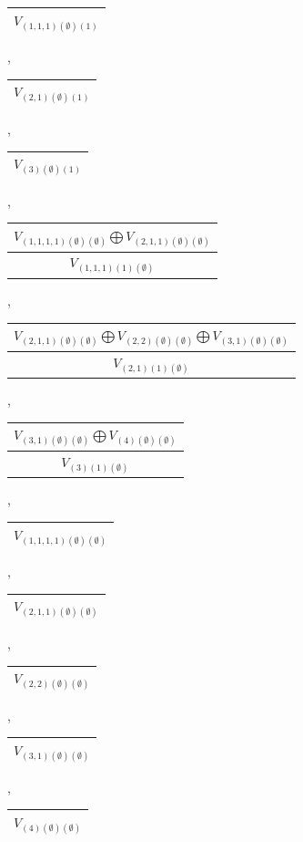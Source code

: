 \documentclass[letterpaper,11pt]{article}
\begin{document}
	\begin{tabular}{| c |}
		\hline
		$V_{(1,1,1)(\emptyset)(1)}$\\
		\hline
	\end{tabular}, 
	\begin{tabular}{| c |}
		\hline
		$V_{(2,1)(\emptyset)(1)}$\\
		\hline
	\end{tabular}, 
	\begin{tabular}{| c |}
		\hline
		$V_{(3)(\emptyset)(1)}$\\
		\hline
	\end{tabular}, 
	\begin{tabular}{| c |}
		\hline
		$V_{(1,1,1,1)(\emptyset)(\emptyset)}$$\bigoplus$$V_{(2,1,1)(\emptyset)(\emptyset)}$\\
		\hline
		$V_{(1,1,1)(1)(\emptyset)}$\\
		\hline
	\end{tabular}, 
	\newline 
	\begin{tabular}{| c |}
		\hline
		$V_{(2,1,1)(\emptyset)(\emptyset)}$$\bigoplus$$V_{(2,2)(\emptyset)(\emptyset)}$$\bigoplus$$V_{(3,1)(\emptyset)(\emptyset)}$\\
		\hline
		$V_{(2,1)(1)(\emptyset)}$\\
		\hline
	\end{tabular}, 
	\begin{tabular}{| c |}
		\hline
		$V_{(3,1)(\emptyset)(\emptyset)}$$\bigoplus$$V_{(4)(\emptyset)(\emptyset)}$\\
		\hline
		$V_{(3)(1)(\emptyset)}$\\
		\hline
	\end{tabular}, 
	\begin{tabular}{| c |}
		\hline
		$V_{(1,1,1,1)(\emptyset)(\emptyset)}$\\
		\hline
	\end{tabular}, 
	\begin{tabular}{| c |}
		\hline
		$V_{(2,1,1)(\emptyset)(\emptyset)}$\\
		\hline
	\end{tabular}, 
	\begin{tabular}{| c |}
		\hline
		$V_{(2,2)(\emptyset)(\emptyset)}$\\
		\hline
	\end{tabular}, 
	\begin{tabular}{| c |}
		\hline
		$V_{(3,1)(\emptyset)(\emptyset)}$\\
		\hline
	\end{tabular}, 
	\begin{tabular}{| c |}
		\hline
		$V_{(4)(\emptyset)(\emptyset)}$\\
		\hline
	\end{tabular}
	
\end{document}
